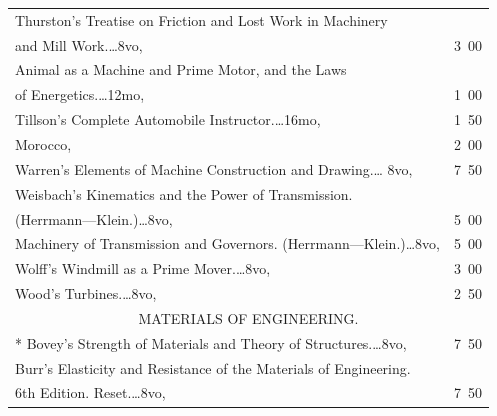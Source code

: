 \documentclass[a4paper,12pt]{book}[2004/02/16]
\theoremstyle{ilemma}
\theoremstyle{itheorem}
\theoremstyle{iother}
\theoremstyle{icorollary}
\theoremstyle{numcorollary}
\theoremstyle{idefinition}
\begin{document}
\begin{longtable}{@{}l@{ }r@{}}
Thurston's Treatise on Friction and Lost Work in Machinery\\

\nopagebreak

\indent\indent and Mill Work.\dotfill\ldots 8vo, &3\ 00\\

\indent Animal as a Machine and Prime Motor, and the Laws\\

\nopagebreak

\indent\indent of Energetics.\dotfill\ldots 12mo, &1\ 00\\

Tillson's Complete Automobile Instructor.\dotfill\ldots 16mo, & 1\ 50\\

\nopagebreak

\hfill Morocco, & 2\ 00\\

Warren's Elements of Machine Construction and Drawing.\dotfill\ldots
8vo, &7\ 50\\

Weisbach's Kinematics and the Power of Transmission. \\

\nopagebreak

\indent\indent (Herrmann---Klein.)\dotfill\ldots 8vo, &5\ 00\\

\indent Machinery of Transmission and
Governors. (Herrmann---Klein.)\dotfill\ldots 8vo, &5\ 00\\

Wolff's Windmill as a Prime Mover.\dotfill\ldots 8vo, &3\ 00\\

Wood's Turbines.\dotfill\ldots 8vo, &2\ 50\\[2em]



\multicolumn{2}{c}{MATERIALS OF ENGINEERING.}\\[1em]

\nopagebreak

* Bovey's Strength of Materials and Theory of
  Structures.\dotfill\ldots 8vo, &7\ 50\\

Burr's Elasticity and Resistance of the Materials of Engineering.\\

\nopagebreak

\indent\indent 6th Edition. Reset.\dotfill\ldots 8vo, &7\ 50\\


\end{longtable}
\end{document}
